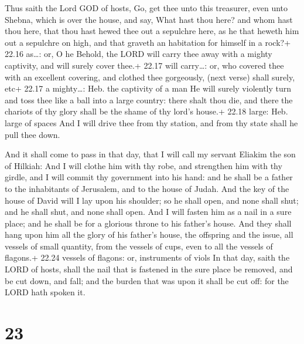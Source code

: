  Thus saith the Lord GOD of hosts, Go, get thee unto this
treasurer, even unto Shebna, which is over the house, and say,
 What hast thou here? and whom hast thou here, that thou
hast hewed thee out a sepulchre here, as he that heweth him out a
sepulchre on high, and that graveth an habitation for himself in a
rock?+ 22.16 as\ldots: or, O he  Behold, the LORD will
carry thee away with a mighty captivity, and will surely cover thee.+
22.17 will carry\ldots: or, who covered thee with an excellent covering,
and clothed thee gorgeously, (next verse) shall surely, etc+ 22.17 a
mighty\ldots: Heb. the captivity of a man  He will surely
violently turn and toss thee like a ball into a large country: there
shalt thou die, and there the chariots of thy glory shall be the shame
of thy lord's house.+ 22.18 large: Heb. large of spaces 
And I will drive thee from thy station, and from thy state shall he pull
thee down.

 And it shall come to pass in that day, that I will call
my servant Eliakim the son of Hilkiah:  And I will clothe
him with thy robe, and strengthen him with thy girdle, and I will commit
thy government into his hand: and he shall be a father to the
inhabitants of Jerusalem, and to the house of Judah.  And
the key of the house of David will I lay upon his shoulder; so he shall
open, and none shall shut; and he shall shut, and none shall open.
 And I will fasten him as a nail in a sure place; and he
shall be for a glorious throne to his father's house.  And
they shall hang upon him all the glory of his father's house, the
offspring and the issue, all vessels of small quantity, from the vessels
of cups, even to all the vessels of flagons.+ 22.24 vessels of flagons:
or, instruments of viols  In that day, saith the LORD of
hosts, shall the nail that is fastened in the sure place be removed, and
be cut down, and fall; and the burden that was upon it shall be cut off:
for the LORD hath spoken it.

\hypertarget{section-22}{%
\section{23}\label{section-22}}

